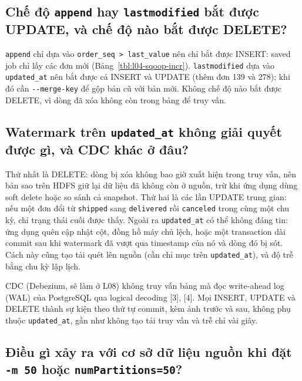 \documentclass[
  12pt,
  a4paper,
]{article}
\begin{document}
\subsection{\texorpdfstring{Chế độ \texttt{append} hay
\texttt{lastmodified} bắt được UPDATE, và chế độ nào bắt được
DELETE?}{Chế độ append hay lastmodified bắt được UPDATE, và chế độ nào bắt được DELETE?}}\label{sec:l04-q5}

\texttt{append} chỉ dựa vào
\texttt{order\_}\allowbreak{}\texttt{seq\ \textgreater{}\ last\_}\allowbreak{}\texttt{value}\allowbreak{}
nên chỉ bắt được INSERT: saved job chỉ lấy các đơn mới
(Bảng~\ref{tbl:l04-sqoop-incr}). \texttt{lastmodified} dựa vào
\texttt{updated\_at} nên bắt được cả INSERT và UPDATE (thêm đơn 139 và
278); khi đó cần \texttt{-\/-merge-key} để gộp bản cũ với bản mới. Không
chế độ nào bắt được DELETE, vì dòng đã xóa không còn trong bảng để truy
vấn.

\subsection{\texorpdfstring{Watermark trên \texttt{updated\_at} không
giải quyết được gì, và CDC khác ở
đâu?}{Watermark trên updated\_at không giải quyết được gì, và CDC khác ở đâu?}}\label{sec:l04-q6}

Thứ nhất là DELETE: dòng bị xóa không bao giờ xuất hiện trong truy vấn,
nên bản sao trên HDFS giữ lại dữ liệu đã không còn ở nguồn, trừ khi ứng
dụng dùng soft delete hoặc so sánh cả snapshot. Thứ hai là các lần
UPDATE trung gian: nếu một đơn đổi từ \texttt{shipped} sang
\texttt{delivered} rồi \texttt{canceled} trong cùng một chu kỳ, chỉ
trạng thái cuối được thấy. Ngoài ra \texttt{updated\_at} có thể không
đáng tin: ứng dụng quên cập nhật cột, đồng hồ máy chủ lệch, hoặc một
transaction dài commit sau khi watermark đã vượt qua timestamp của nó và
dòng đó bị sót. Cách này cũng tạo tải quét lên nguồn (cần chỉ mục trên
\texttt{updated\_at}), và độ trễ bằng chu kỳ lập lịch.

CDC (Debezium, sẽ làm ở L08) không truy vấn bảng mà đọc write-ahead log
(WAL) của PostgreSQL qua logical decoding {[}3{]}, {[}4{]}. Mọi INSERT,
UPDATE và DELETE thành sự kiện theo thứ tự commit, kèm ảnh trước và sau,
không phụ thuộc \texttt{updated\_at}, gần như không tạo tải truy vấn và
trễ chỉ vài giây.

\subsection{\texorpdfstring{Điều gì xảy ra với cơ sở dữ liệu nguồn khi
đặt \texttt{-m\ 50} hoặc
\texttt{numPartitions=}\allowbreak{}\texttt{50}\allowbreak{}?}{Điều gì xảy ra với cơ sở dữ liệu nguồn khi đặt -m 50 hoặc numPartitions=50?}}\label{sec:l04-q7}
\end{document}
